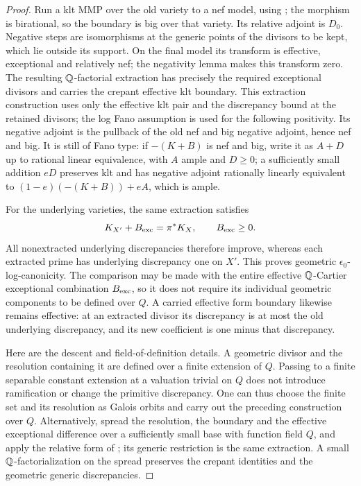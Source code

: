 \begin{proof}
Run a klt MMP over the old variety to a nef model, using
\cite{BCHM}; the morphism is birational, so the boundary is big
over that variety.  Its relative adjoint is $D_0$.
Negative steps are isomorphisms at the generic points of the
divisors to be kept, which lie outside its support.
On the final model its transform is effective, exceptional and
relatively nef; the negativity lemma makes this transform zero.
The resulting $\mathbb Q$-factorial extraction has precisely the required
exceptional divisors and carries the crepant effective klt
boundary.  This extraction construction uses only the effective
klt pair and the discrepancy bound at the retained divisors;
the log Fano assumption is used for the following positivity.
Its negative adjoint is the pullback of the old nef and big
negative adjoint, hence nef and big.  It is still of Fano type:
if $-(K+B)$ is nef and big, write it as $A+D$ up to rational
linear equivalence, with $A$ ample and $D\ge0$; a sufficiently
small addition $eD$ preserves klt and has negative adjoint
rationally linearly equivalent to
$(1-e)(-(K+B))+eA$, which is ample.

For the underlying varieties, the same extraction satisfies
\[
 K_{X'}+B_{\rm exc}=\pi^*K_X,\qquad B_{\rm exc}\ge0.
\]
All nonextracted underlying discrepancies therefore improve,
whereas each extracted prime has underlying discrepancy one on
$X'$.  This proves geometric $\epsilon_0$-log-canonicity.
The comparison may be made with the entire effective
$\mathbb Q$-Cartier exceptional combination $B_{\rm exc}$, so it does
not require its individual geometric components to be defined
over $Q$.  A carried effective form boundary likewise remains
effective: at an extracted divisor its discrepancy is at most
the old underlying discrepancy, and its new coefficient is one
minus that discrepancy.

Here are the descent and field-of-definition details.  A geometric
divisor and the resolution containing it are defined over a finite
extension of $Q$.  Passing to a finite separable constant extension
at a valuation trivial on $Q$ does not introduce ramification or
change the primitive discrepancy.  One can thus choose the finite
set and its resolution as Galois orbits and carry out the preceding
construction over $Q$.  Alternatively, spread the resolution,
the boundary and the effective exceptional difference over a
sufficiently small base with function field $Q$, and apply the
relative form of \cite{BCHM}; its generic restriction is the same
extraction.  A small $\mathbb Q$-factorialization on the spread preserves
the crepant identities and the geometric generic discrepancies.


\end{proof}

